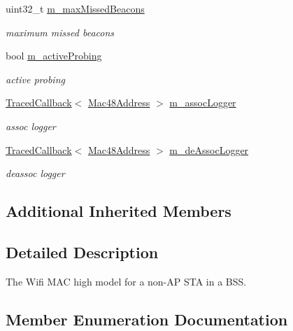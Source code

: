 \begin{DoxyCompactItemize}
uint32\+\_\+t \hyperlink{classns3_1_1StaWifiMac_a725655d9a8bb335d6156a0c0a5b0753f}{m\+\_\+max\+Missed\+Beacons}
\begin{DoxyCompactList}\small\item\em maximum missed beacons \end{DoxyCompactList}\item 
bool \hyperlink{classns3_1_1StaWifiMac_a0bfa3d83212fbf876124763adb7b22cf}{m\+\_\+active\+Probing}
\begin{DoxyCompactList}\small\item\em active probing \end{DoxyCompactList}\item 
\hyperlink{classns3_1_1TracedCallback}{Traced\+Callback}$<$ \hyperlink{classns3_1_1Mac48Address}{Mac48\+Address} $>$ \hyperlink{classns3_1_1StaWifiMac_a75a9eb286b8843baff0514d02a21e811}{m\+\_\+assoc\+Logger}
\begin{DoxyCompactList}\small\item\em assoc logger \end{DoxyCompactList}\item 
\hyperlink{classns3_1_1TracedCallback}{Traced\+Callback}$<$ \hyperlink{classns3_1_1Mac48Address}{Mac48\+Address} $>$ \hyperlink{classns3_1_1StaWifiMac_a1efb70af228ede5022ab5d054441a040}{m\+\_\+de\+Assoc\+Logger}
\begin{DoxyCompactList}\small\item\em deassoc logger \end{DoxyCompactList}\end{DoxyCompactItemize}
\subsection*{Additional Inherited Members}


\subsection{Detailed Description}
The Wifi M\+AC high model for a non-\/\+AP S\+TA in a B\+SS. 

\subsection{Member Enumeration Documentation}
